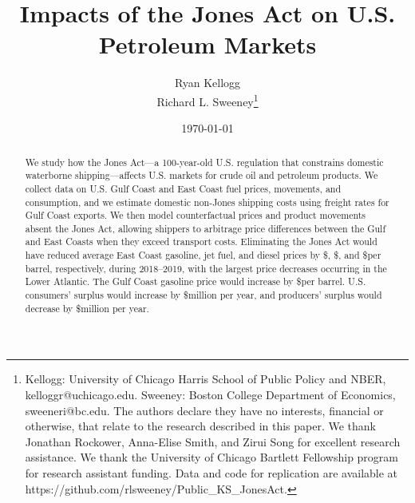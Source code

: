\documentclass[12pt]{article}
\begin{document}
\title{Impacts of the Jones Act on U.S. Petroleum Markets
\vspace{10pt}}

\author{Ryan Kellogg \\ Richard L. Sweeney\thanks{Kellogg: University of Chicago Harris School of Public Policy and NBER, kelloggr@uchicago.edu. Sweeney: Boston College Department of Economics, sweeneri@bc.edu. The authors declare they have no interests, financial or otherwise, that relate to the research described in this paper. We thank Jonathan Rockower, Anna-Elise Smith, and Zirui Song for excellent research assistance. We thank the University of Chicago Bartlett Fellowship program for research assistant funding. Data and code for replication are available at https://github.com/rlsweeney/Public\_KS\_JonesAct.}}

\date{\today \\
 \vspace{0.5cm}
}
\maketitle
\thispagestyle{empty}	
\begin{abstract}


We study how the Jones Act---a 100-year-old U.S. regulation that constrains domestic waterborne shipping---affects U.S. markets for crude oil and petroleum products. We collect data on U.S. Gulf Coast and East Coast fuel prices, movements, and consumption, and we estimate domestic non-Jones shipping costs using freight rates for Gulf Coast exports. We then model counterfactual prices and product movements absent the Jones Act, allowing shippers to arbitrage price differences between the Gulf and East Coasts when they exceed transport costs. Eliminating the Jones Act would have reduced average East Coast gasoline, jet fuel, and diesel prices by \$\unskip, \$\unskip, and \$per barrel, respectively, during 2018--2019, with the largest price decreases occurring in the Lower Atlantic. The Gulf Coast gasoline price would increase by \$per barrel. U.S. consumers' surplus would increase by \$million per year, and producers' surplus would decrease by \$million per year.



\end{abstract}
\end{document}
